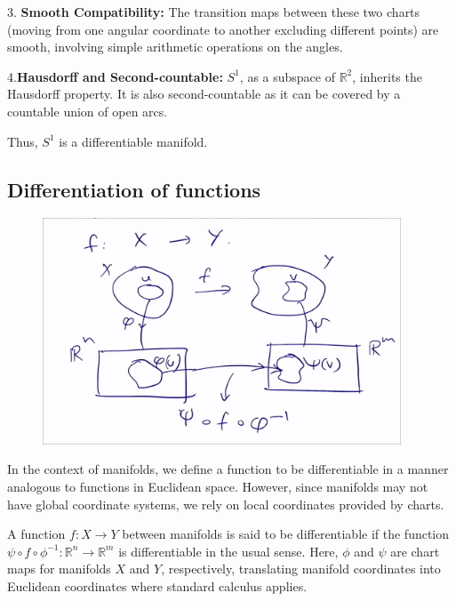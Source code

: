 \documentclass{article}
\begin{document}
3. \textbf{Smooth Compatibility:} The transition maps between these two charts (moving from one angular coordinate to another excluding different points) are smooth, involving simple arithmetic operations on the angles.

4.\textbf{Hausdorff and Second-countable:}  \(S^1\), as a subspace of \(\mathbb{R}^2\), inherits the Hausdorff property. It is also second-countable as it can be covered by a countable union of open arcs.

Thus, \(S^1\) is a differentiable manifold.

\subsection{Differentiation of functions} 

\begin{figure}
    \begin{center}
        \includegraphics[width=0.95\textwidth]{figures/eq_manifolds.png}
    \end{center}
    \caption{}\label{fig:}
\end{figure}

In the context of manifolds, we define a function to be differentiable in a manner analogous to functions in Euclidean space. However, since manifolds may not have global coordinate systems, we rely on local coordinates provided by charts.

\begin{theorem}
A function \( f: X \to Y \) between manifolds is said to be differentiable if the function \(\psi \circ f \circ \phi^{-1} : \mathbb{R}^n \to \mathbb{R}^m\) is differentiable in the usual sense. Here, \(\phi\) and \(\psi\) are chart maps for manifolds \(X\) and \(Y\), respectively, translating manifold coordinates into Euclidean coordinates where standard calculus applies.
\end{theorem}
\end{document}
